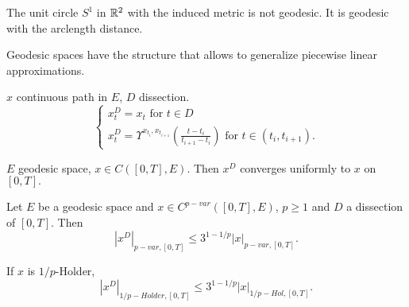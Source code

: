 \begin{example}
    The unit circle $S^1$ in $\mathbb{R}^2$ with the induced metric is not geodesic. It is geodesic with the arclength distance.
\end{example}

Geodesic spaces have the structure that allows to generalize piecewise linear approximations.

\begin{definition}[PL approximations]
    $x$ continuous path in $E$, $D$ dissection.
    \begin{equation}
        \begin{cases}
            x^D_t = x_t \text{ for } t \in D \\
            x^D_t = \Upsilon^{x_{t_i}, x_{t_{i+1}}} \left( \frac{t - t_i}{t_{i+1} - t_i} \right) \text{ for } t \in (t_i, t_{i+1}). 
        \end{cases}
    \end{equation}
\end{definition}

\begin{lemma}
    $E$ geodesic space, $x \in C([0,T],E).$ Then $x^D$ converges uniformly to $x$ on $[0,T].$
\end{lemma}

\begin{proposition}
    Let $E$ be a geodesic space and $x \in C^{p-var}([0,T], E)$, $p \ge 1$ and $D$ a dissection of $[0,T]$. Then
    \begin{equation}
        |x^D|_{p-var,[0,T]} \le 3^{1-1/p} |x|_{p-var, [0,T]}.
    \end{equation}

    If $x$ is $1/p$-Holder,
    \begin{equation}
        |x^D|_{1/p-Holder,[0,T]} \le 3^{1-1/p} |x|_{1/p-Hol, [0,T]}.
    \end{equation}
\end{proposition}